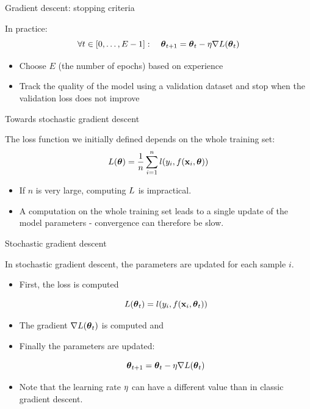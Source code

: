 \documentclass[xcolor=pdftex,dvipsnames,table,mathserif]{beamer}
\begin{document}
\begin{frame}{Gradient descent: stopping criteria}

  In practice:
  \[
  \forall t \in [0, \ldots, E-1]:\quad \boldsymbol{\theta}_{t+1} = \boldsymbol{\theta}_t - \eta \nabla L(\boldsymbol{\theta}_t)
  \]

  \begin{itemize}
  \item Choose $E$ (the number of \alert{epochs}) based on experience
  \item Track the quality of the model using a validation dataset and stop when the validation loss does not improve
  \end{itemize}


\end{frame}
\begin{frame}{Towards stochastic gradient descent}

  The loss function we initially defined depends on the whole training set:
  \[
  L(\boldsymbol{\theta}) = \frac{1}{n} \sum\limits_{i=1}^n l(y_i, f(\mathbf{x}_i, \boldsymbol{\theta}))
  \]

  \pause

  \begin{itemize}[<+->]
  \item If $n$ is very large, computing $L$ is impractical.
  \item A computation on the whole training set leads to a single update of the model parameters - convergence can therefore be slow.
  \end{itemize}

\end{frame}



\begin{frame}{Stochastic gradient descent}

  In \alert{stochastic gradient descent}, the parameters are updated for each sample $i$.

  \begin{itemize}[<+->]
  \item
    First, the loss is computed

    \[
    L(\boldsymbol{\theta}_t) = l(y_i, f(\mathbf{x}_i, \boldsymbol{\theta}_t))
    \]
  \item
    The gradient $\nabla L(\boldsymbol{\theta}_t)$ is computed and
  \item Finally the parameters are updated:

    \[
    \boldsymbol{\theta}_{t+1} = \boldsymbol{\theta}_t - \eta\nabla L(\boldsymbol{\theta}_t)
    \]
  \item
    Note that the learning rate $\eta$ can have a different value than in classic gradient descent.
  \end{itemize}

\end{frame}
\end{document}

